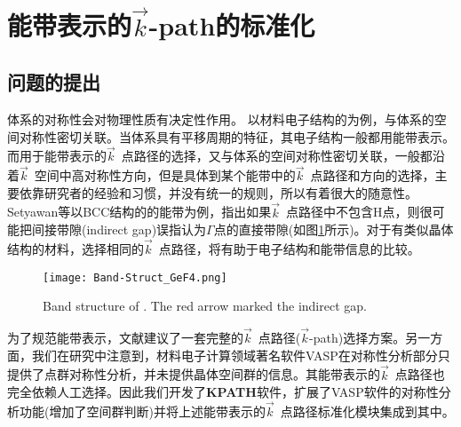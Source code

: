 \documentclass{article}      %
\newcommand{\upcite}[1]{\hspace{0ex}\textsuperscript{\cite{#1}}} %
\begin{document}


\section{能带表示的$\vec k$-\rm{path}的标准化}
\subsection{问题的提出}
体系的对称性会对物理性质有决定性作用。%
以材料电子结构的为例，与体系的空间对称性密切关联。当体系具有平移周期的特征，其电子结构一般都用能带表示。而用于能带表示的$\vec k$~点路径的选择，又与体系的空间对称性密切关联，一般都沿着$\vec k$~空间中高对称性方向，但是具体到某个能带中的$\vec k$~点路径和方向的选择，主要依靠研究者的经验和习惯，并没有统一的规则，所以有着很大的随意性。\textrm{Setyawan}等\upcite{CMS49-299_2010}以\textrm{BCC}结构的的能带为例，指出如果$\vec k$~点路径中不包含\textrm{H}点，则很可能把间接带隙(\textrm{indirect gap})误指认为$\Gamma$点的直接带隙(如图\ref{Band_Gap_BCC_GeF4}所示)。对于有类似晶体结构的材料，选择相同的$\vec k$~点路径，将有助于电子结构和能带信息的比较。
\begin{figure}[h!]
\centering
\texttt{[image: Band-Struct\_GeF4.png]}
\caption{\small{\textrm{Band structure of . The red arrow marked the indirect gap.}}}
\label{Band_Gap_BCC_GeF4}
\end{figure}

为了规范能带表示，文献\cite{CMS49-299_2010}建议了一套完整的$\vec k$~点路径($\vec k$-\textrm{path})选择方案。另一方面，我们在研究中注意到，材料电子计算领域著名软件\textrm{VASP}\upcite{VASP_manual}在对称性分析部分只提供了点群对称性分析，并未提供晶体空间群的信息。其能带表示的$\vec k$~点路径也完全依赖人工选择。因此我们开发了\textbf{KPATH}软件，扩展了\textrm{VASP}软件的对称性分析功能(增加了空间群判断)并将上述能带表示的$\vec k$~点路径标准化模块集成到其中。
\end{document}
